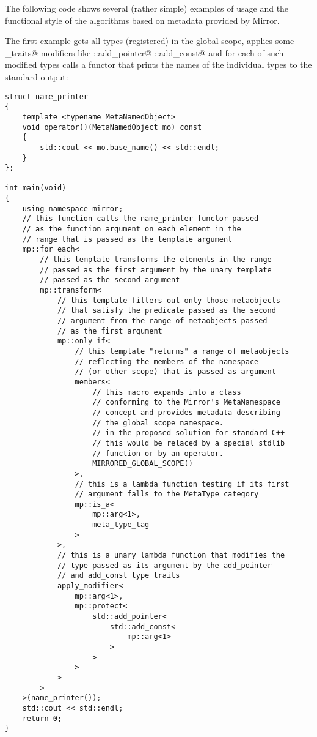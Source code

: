 The following code shows several (rather simple) examples of usage
and the functional style of the algorithms based on metadata provided by Mirror.

The first example gets all types (registered) in the global scope,
applies some \verb@type_traits@ modifiers like \verb@std::add_pointer@
\verb@std::add_const@ and for each of such modified types calls a functor
that prints the names of the individual types to the standard output:

\begin{lstlisting}
struct name_printer
{
    template <typename MetaNamedObject>
    void operator()(MetaNamedObject mo) const
    {
        std::cout << mo.base_name() << std::endl;
    }
};

int main(void)
{
    using namespace mirror;
    // this function calls the name_printer functor passed
    // as the function argument on each element in the 
    // range that is passed as the template argument
    mp::for_each<
        // this template transforms the elements in the range
        // passed as the first argument by the unary template
        // passed as the second argument
        mp::transform<
            // this template filters out only those metaobjects
            // that satisfy the predicate passed as the second
            // argument from the range of metaobjects passed
            // as the first argument
            mp::only_if<
                // this template "returns" a range of metaobjects
                // reflecting the members of the namespace
                // (or other scope) that is passed as argument
                members<
                    // this macro expands into a class
                    // conforming to the Mirror's MetaNamespace
                    // concept and provides metadata describing
                    // the global scope namespace.
                    // in the proposed solution for standard C++
                    // this would be relaced by a special stdlib
                    // function or by an operator.
                    MIRRORED_GLOBAL_SCOPE()
                >,
                // this is a lambda function testing if its first
                // argument falls to the MetaType category
                mp::is_a<
                    mp::arg<1>,
                    meta_type_tag
                >
            >,
            // this is a unary lambda function that modifies the
            // type passed as its argument by the add_pointer
            // and add_const type traits
            apply_modifier<
                mp::arg<1>,
                mp::protect<
                    std::add_pointer<
                        std::add_const<
                            mp::arg<1>
                        >
                    >
                >
            >
        >
    >(name_printer());
    std::cout << std::endl;
    return 0;
}

\end{lstlisting}


